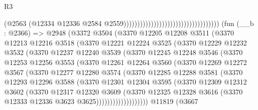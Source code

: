 \begin{lexlean}{R3}
\begin{coremodule}
                                                                      (@2563
                                                                        (@12334
                                                                          @12336
                                                                          @2584
                                                                          @2559)))))))))))))))))))))))))))))))))))
    (fun (__b : @2366) =>
    @2948
      (@3372
        @3504
        (@3370
          @12205
          @12208
          @3511
          (@3370
            @12213
            @12216
            @3518
            (@3370
              @12221
              @12224
              @3525
              (@3370
                @12229
                @12232
                @3532
                (@3370
                  @12237
                  @12240
                  @3539
                  (@3370
                    @12245
                    @12248
                    @3546
                    (@3370
                      @12253
                      @12256
                      @3553
                      (@3370
                        @12261
                        @12264
                        @3560
                        (@3370
                          @12269
                          @12272
                          @3567
                          (@3370
                            @12277
                            @12280
                            @3574
                            (@3370
                              @12285
                              @12288
                              @3581
                              (@3370
                                @12293
                                @12296
                                @3588
                                (@3370
                                  @12301
                                  @12304
                                  @3595
                                  (@3370
                                    @12309
                                    @12312
                                    @3602
                                    (@3370
                                      @12317
                                      @12320
                                      @3609
                                      (@3370
                                        @12325
                                        @12328
                                        @3616
                                        (@3370 @12333 @12336 @3623 @3625)))))))))))))))))))
    @11819
    (@3667

\end{coremodule}
\end{lexlean}
